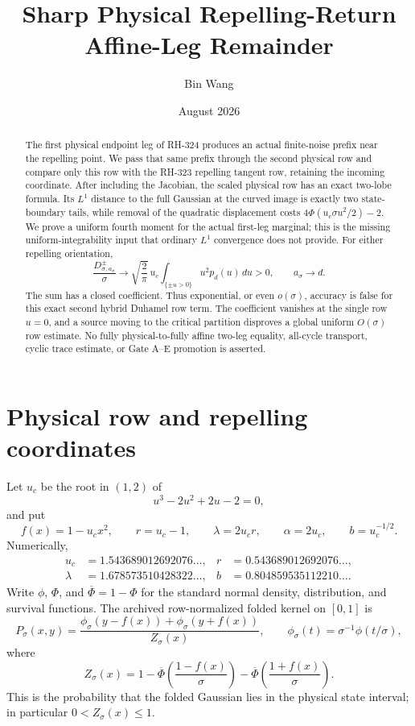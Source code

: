 \documentclass[11pt]{article}
\title{Sharp Physical Repelling-Return Affine-Leg Remainder}
\author{Bin Wang}
\date{August 2026}
\theoremstyle{definition}
\theoremstyle{remark}
\newcommand{\1}{\mathbf 1}
\begin{document}
\maketitle

\begin{abstract}
The first physical endpoint leg of RH-324 produces an actual finite-noise
prefix near the repelling point.  We pass that same prefix through the
second physical row and compare only this row with the RH-323 repelling
tangent row, retaining the incoming coordinate.  After including the
Jacobian, the scaled physical row has an exact two-lobe formula.  Its
$L^1$ distance to the full Gaussian at the curved image is exactly two
state-boundary tails, while removal of the quadratic displacement costs
\(4\Phi(u_c\sigma u^2/2)-2\).  We prove a uniform fourth moment for the
actual first-leg marginal; this is the missing uniform-integrability input
that ordinary $L^1$ convergence does not provide.  For either repelling
orientation,
\[
 \frac{D_{\sigma,a_\sigma}^{\pm}}{\sigma}
 \longrightarrow
 \sqrt{\frac2\pi}\,u_c
 \int_{\{\pm u>0\}}u^2p_d(u)\,du>0,
 \qquad a_\sigma\longrightarrow d.
\]
The sum has a closed coefficient.  Thus exponential, or even
$o(\sigma)$, accuracy is false for this exact second hybrid Duhamel row
term.  The coefficient vanishes at the single row $u=0$, and a source
moving to the critical partition disproves a global uniform $O(\sigma)$
row estimate.  No fully physical-to-fully affine two-leg equality,
all-cycle transport, cyclic trace estimate, or Gate A--E promotion is
asserted.
\end{abstract}

\section{Physical row and repelling coordinates}

Let $u_c$ be the root in $(1,2)$ of
\[
 u^3-2u^2+2u-2=0,
\]
and put
\begin{equation}\label{eq:constants}
 f(x)=1-u_cx^2,
 \qquad r=u_c-1,
 \qquad \lambda=2u_cr,
 \qquad \alpha=2u_c,
 \qquad b=u_c^{-1/2}.
\end{equation}
Numerically,
\begin{align*}
 u_c&=1.543689012692076\ldots,
 &r&=0.543689012692076\ldots,\\
 \lambda&=1.678573510428322\ldots,
 &b&=0.804859535112210\ldots .
\end{align*}
Write $\phi$, $\Phi$, and $\overline\Phi=1-\Phi$ for the standard normal
density, distribution, and survival functions.  The archived row-normalized
folded kernel on $[0,1]$ is
\begin{equation}\label{eq:physical-kernel}
 P_\sigma(x,y)=
 \frac{\phi_\sigma(y-f(x))+\phi_\sigma(y+f(x))}{Z_\sigma(x)},
 \qquad
 \phi_\sigma(t)=\sigma^{-1}\phi(t/\sigma),
\end{equation}
where
\begin{equation}\label{eq:normalizer}
 Z_\sigma(x)=
 1-\overline\Phi\!\left(\frac{1-f(x)}\sigma\right)
  -\overline\Phi\!\left(\frac{1+f(x)}\sigma\right).
\end{equation}
This is the probability that the folded Gaussian lies in the physical
state interval; in particular $0<Z_\sigma(x)\le1$.
\end{document}
